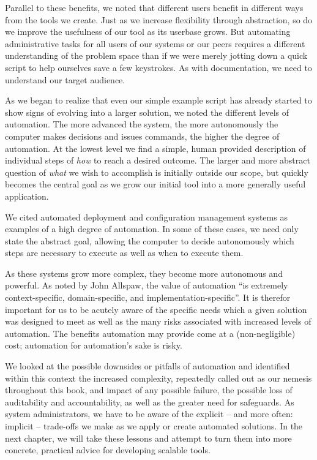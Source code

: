 Parallel to these benefits, we noted that different
users benefit in different ways from the tools we
create.  Just as we increase flexibility through
abstraction, so do we improve the usefulness of our
tool as its userbase grows.  But automating
administrative tasks for all users of our systems or
our peers requires a different understanding of the
problem space than if we were merely jotting down a
quick script to help ourselves save a few keystrokes.
As with documentation, we need to understand our
target audience.

As we began to realize that even our simple example
script has already started to show signs of evolving
into a larger solution, we noted the different levels
of automation.  The more advanced the system, the more
autonomously the computer makes decisions and issues
commands, the higher the degree of automation.  At the
lowest level we find a simple, human provided
description of individual steps of {\em how} to reach
a desired outcome.  The larger and more abstract
question of {\em what} we wish to accomplish is
initially outside our scope, but quickly becomes the
central goal as we grow our initial tool into a more
generally useful application.

We cited automated deployment and configuration
management systems as examples of a high degree of
automation.  In some of these cases, we need only
state the abstract goal, allowing the computer to
decide autonomously which steps are necessary to
execute as well as when to execute them.

As these systems grow more complex, they become more
autonomous and powerful.  As noted by John
Allspaw, the value of
automation ``is extremely context-specific,
domain-specific, and
implementation-specific''\cite{automation:allspaw}.
It is therefor important for us to be acutely aware of
the specific needs which a given solution was designed
to meet as well as the many risks associated with
increased levels of automation.  The benefits
automation may provide come at a (non-negligible)
cost; automation for automation's sake is risky.

We looked at the possible downsides or pitfalls of
automation and identified within this context the
increased complexity, repeatedly called out as our
nemesis throughout this book, and impact of any
possible failure, the possible loss of auditability
and accountability, as well as the greater need for
safeguards.  As system administrators, we have to be
aware of the explicit -- and more often: implicit --
trade-offs we make as we apply or create automated
solutions.  In the next chapter, we will take these
lessons and attempt to turn them into more concrete,
practical advice for developing scalable tools.

